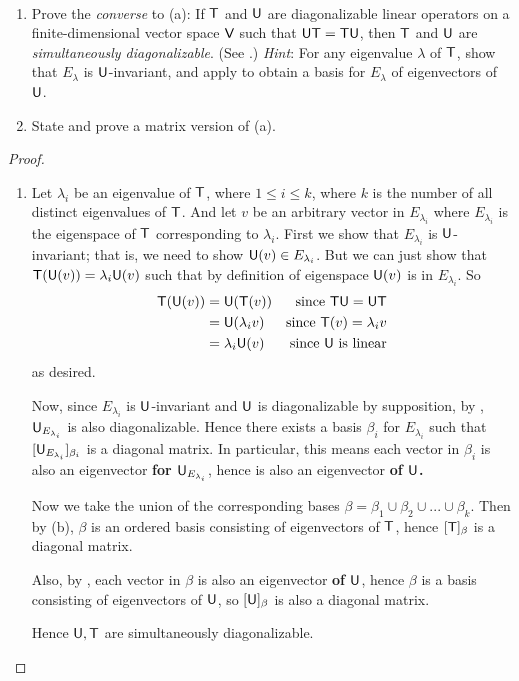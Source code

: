 \begin{exercise} \label{exercise 5.4.25} \ 

\begin{enumerate}
\item Prove the \emph{converse} to (a): If \(\textsf{T}\) and \(\textsf{U}\) are diagonalizable linear operators on a finite-dimensional vector space \(\textsf{V}\) such that \(\textsf{U}\textsf{T} = \textsf{T}\textsf{U}\), then \(\textsf{T}\) and \(\textsf{U}\) are \emph{simultaneously diagonalizable}.
(See .)
\emph{Hint}: For any eigenvalue \(\lambda\) of \(\textsf{T}\), show that \(E_{\lambda}\) is \(\textsf{U}\)-invariant, and apply  to obtain a basis for \(E_{\lambda}\) of eigenvectors of \(\textsf{U}\).
\item State and prove a matrix version of (a).
\end{enumerate}
\end{exercise}

\begin{proof} \ 

\begin{enumerate}
\item

Let \(\lambda_i\) be an eigenvalue of \(\textsf{T}\), where \(1 \le i \le k\), where \(k\) is the number of all distinct eigenvalues of \(\textsf{T}\).
And let \(v\) be an arbitrary vector in \(E_{\lambda_i}\) where \(E_{\lambda_i}\) is the eigenspace of \(\textsf{T}\) corresponding to \(\lambda_i\).
First we show that \(E_{\lambda_i}\) is \(\textsf{U}\)-invariant; that is, we need to show \(\textsf{U}(v) \in E_{\lambda_i}\).
But we can just show that \(\textsf{T}(\textsf{U}(v)) = \lambda_i \textsf{U}(v)\) such that by definition of eigenspace \(\textsf{U}(v)\) is in \(E_{\lambda_i}\).
So
\begin{align*}
    \textsf{T}(\textsf{U}(v))
        & = \textsf{U}(\textsf{T}(v)) & \text{since \(\textsf{T}\textsf{U}= \textsf{U}\textsf{T}\)} \\
        & = \textsf{U}( \lambda_i v ) & \text{since \(\textsf{T}(v) = \lambda_i v\)} \\
        & = \lambda_i \textsf{U}(v) & \text{since \(\textsf{U}\) is linear}
\end{align*}
as desired.

Now, since \(E_{\lambda_i}\) is \(\textsf{U}\)-invariant and \(\textsf{U}\) is diagonalizable by supposition, by , \(\textsf{U}_{E_{\lambda_i}}\) is also diagonalizable.
Hence there exists a basis \(\beta_i\) for \(E_{\lambda_i}\) such that \([\textsf{U}_{E_{\lambda_i}}]_{\beta_i}\) is a diagonal matrix.
In particular, this means each vector in \(\beta_i\) is also an eigenvector \textbf{for \(\textsf{U}_{E_{\lambda_i}}\)}, hence is also an eigenvector \textbf{of \(\textsf{U}\).} 


Now we take the union of the corresponding bases \(\beta = \beta_1 \cup \beta_2 \cup ... \cup \beta_k\).
Then by (b), \(\beta\) is an ordered basis consisting of eigenvectors of \(\textsf{T}\), hence \([\textsf{T}]_{\beta}\) is a diagonal matrix.

Also, by , each vector in \(\beta\) is also an eigenvector \textbf{of \(\textsf{U}\)}, hence \(\beta\) is a basis consisting of eigenvectors of \(\textsf{U}\), so \([\textsf{U}]_{\beta}\) is also a diagonal matrix.

Hence \(\textsf{U}, \textsf{T}\) are simultaneously diagonalizable.
\end{enumerate}
\end{proof}

